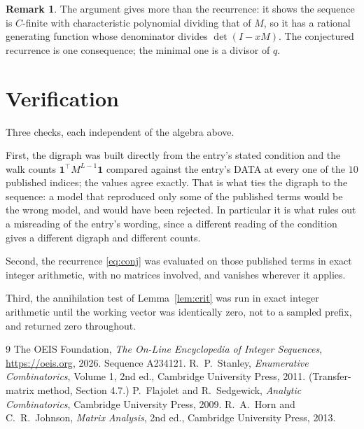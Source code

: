 \documentclass[11pt,a4paper]{article}
\theoremstyle{plain}
\theoremstyle{definition}
\newtheorem{remark}[theorem]{Remark}
\begin{document}
\begin{remark}
The argument gives more than the recurrence: it shows the sequence is $C$-finite with
characteristic polynomial dividing that of $M$, so it has a rational generating function
whose denominator divides $\det(I-xM)$. The conjectured recurrence is one consequence; the
minimal one is a divisor of $q$.
\end{remark}

\section{Verification}

Three checks, each independent of the algebra above.

First, the digraph was built directly from the entry's stated condition and the walk counts
$\mathbf{1}^{\!\top}M^{L-1}\mathbf{1}$ compared against the entry's DATA at
every one of the $10$ published indices; the values agree exactly. That is what ties
the digraph to the sequence: a model that reproduced only some of the published terms would
be the wrong model, and would have been rejected. In particular it is what rules out a
misreading of the entry's wording, since a different reading of the condition gives a
different digraph and different counts.

Second, the recurrence \eqref{eq:conj} was evaluated on those published terms in exact
integer arithmetic, with no matrices involved, and vanishes wherever it applies.

Third, the annihilation test of Lemma~\ref{lem:crit} was run in exact integer arithmetic
until the working vector was identically zero, not to a sampled prefix, and returned zero
throughout.

\begin{thebibliography}{9}
 The OEIS Foundation, \emph{The On-Line Encyclopedia of Integer
Sequences}, \url{https://oeis.org}, 2026. Sequence A234121.
 R.~P.~Stanley, \emph{Enumerative Combinatorics}, Volume 1, 2nd ed.,
Cambridge University Press, 2011. (Transfer-matrix method, Section 4.7.)
 P.~Flajolet and R.~Sedgewick, \emph{Analytic Combinatorics}, Cambridge
University Press, 2009.
 R.~A.~Horn and C.~R.~Johnson, \emph{Matrix Analysis}, 2nd ed., Cambridge
University Press, 2013.
\end{thebibliography}
\end{document}
